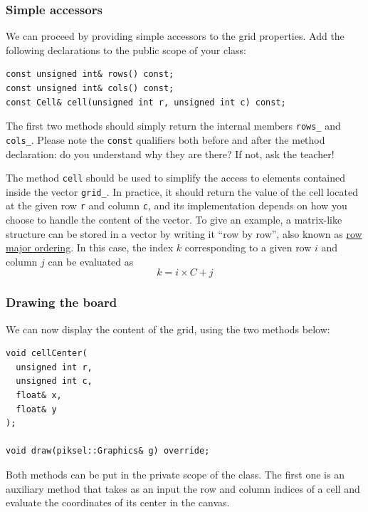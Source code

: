 \documentclass{article}
\begin{document}
\subsubsection{Simple accessors}\label{sec:simple_accessors}

We can proceed by providing simple accessors to the grid properties. Add the following declarations to the public scope of your class:
\begin{center}
\begin{minipage}{.9\textwidth}
\begin{lstlisting}[style=mycpp,numbers=none]
const unsigned int& rows() const;
const unsigned int& cols() const;
const Cell& cell(unsigned int r, unsigned int c) const;
\end{lstlisting}
\end{minipage}
\end{center}
The first two methods should simply return the internal members \texttt{rows\_} and \texttt{cols\_}. Please note the \texttt{const} qualifiers both before and after the method declaration: do you understand why they are there? If not, ask the teacher!

The method \texttt{cell} should be used to simplify the access to elements contained inside the vector \texttt{grid\_}. In practice, it should return the value of the cell located at the given row \texttt{r} and column \texttt{c}, and its implementation depends on how you choose to handle the content of the vector. To give an example, a matrix-like structure can be stored in a vector by writing it ``row by row'', also known as \href{https://en.wikipedia.org/wiki/Row-_and_column-major_order#Programming_languages_and_libraries}{row major ordering}. In this case, the index $k$ corresponding to a given row $i$ and column $j$ can be evaluated as $$k = i \times C + j$$


\subsubsection{Drawing the board}

We can now display the content of the grid, using the two methods below:
\begin{center}
\begin{minipage}{.9\textwidth}
\begin{lstlisting}[style=mycpp,numbers=none]
void cellCenter(
  unsigned int r,
  unsigned int c,
  float& x,
  float& y
);

void draw(piksel::Graphics& g) override;
\end{lstlisting}
\end{minipage}
\end{center}
Both methods can be put in the private scope of the class. The first one is an auxiliary method that takes as an input the row and column indices of a cell and evaluate the coordinates of its center in the canvas.
\end{document}
